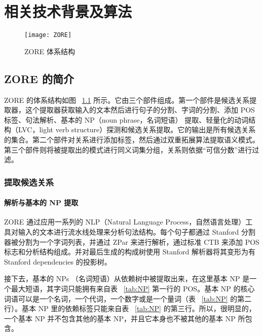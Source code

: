 \chapter{相关技术背景及算法}
\label{chap:algorithm}

\begin{figure}[ht]
\centering
\texttt{[image: ZORE]}
\caption{ZORE 体系结构}\label{fig:ZORE}
\end{figure}

\section{ZORE 的简介}
ZORE 的体系结构如图 ~\ref{fig:ZORE} 所示。它由三个部件组成。第一个部件是候选关系提取器，这个提取器获取输入的文本然后进行句子的分割、字词的分割、添加 POS 标签、句法解析、基本的 NP（noun phrase，名词短语） 提取、轻量化的动词结构（LVC，light verb structure）探测和候选关系提取。它的输出是所有候选关系的集合。第二个部件对关系进行添加标签，然后通过双重拓展算法提取语义模式。第三个部件则将被提取出的模式进行同义词集分组，关系则依据“可信分数”进行过滤。

\subsection{提取候选关系}

\subsubsection{解析与基本的 NP 提取}
ZORE 通过应用一系列的 NLP（Natural Language Process，自然语言处理）工具对输入的文本进行流水线处理来分析句法结构。每个句子都通过 Stanford 分割器\citep{chang2008}被分割为一个字词列表，并通过 ZPar \citep{zhang2011}来进行解析，通过标准 CTB \citep{xue2005}来添加 POS 标志和分析结构组成。并对最后生成的构成树使用 Stanford 解析器\citep{chang2008}将其变形为有 Stanford dependencies 的投影树。

接下去，基本的 NPs （名词短语）从依赖树中被提取出来，在这里基本 NP 是一个最大短语，其字词只能拥有来自表 ~\ref{tab:NP} 第一行的 POS。基本 NP 的核心词语可以是一个名词，一个代词，一个数字或是一个量词（表 ~\ref{tab:NP} 的第二行）。基本 NP 里的依赖标签只能来自表 ~\ref{tab:NP} 的第三行。所以，很明显的，一个基本 NP 并不包含其他的基本 NP，并且它本身也不被其他的基本 NP 所包含。

